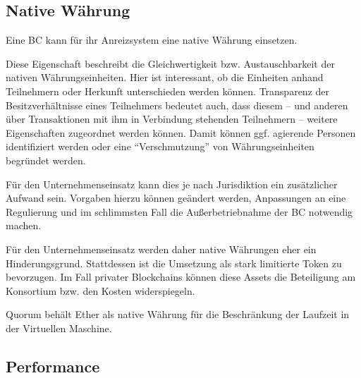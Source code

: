 
\subsection{Native Währung}\label{krit:waehrung}

Eine \gls{BC} kann für ihr Anreizsystem eine native Währung einsetzen.


Diese Eigenschaft beschreibt die Gleichwertigkeit bzw. Austauschbarkeit der nativen Währungseinheiten.
Hier ist interessant, ob die Einheiten anhand Teilnehmern oder Herkunft unterschieden werden können.
Transparenz der Besitzverhältnisse eines Teilnehmers bedeutet auch, dass diesem -- und anderen über Transaktionen mit ihm in Verbindung stehenden Teilnehmern -- weitere Eigenschaften zugeordnet werden können.
Damit können ggf. agierende Personen identifiziert werden oder eine \enquote{Verschmutzung} von Währungseinheiten begründet werden.

Für den Unternehmenseinsatz kann dies je nach Jurisdiktion ein zusätzlicher Aufwand sein.
Vorgaben hierzu können geändert werden,  Anpassungen an eine Regulierung und im schlimmsten Fall die Außerbetriebnahme der \gls{BC} notwendig machen.

Für den Unternehmenseinsatz werden daher native Währungen eher ein Hinderungsgrund.
Stattdessen ist die Umsetzung als stark limitierte Token zu bevorzugen.
Im Fall privater Blockchains können diese Assets die Beteiligung am Konsortium bzw. den Kosten widerspiegeln.

Quorum behält Ether als native Währung für die Beschränkung der Laufzeit in der Virtuellen Maschine. 

\subsection{Performance}\label{krit:performance}

